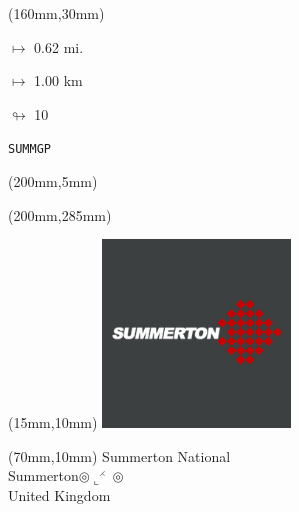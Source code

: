 \begin{textblock*}{40mm}(160mm,30mm)%
\Large
\par$\mapsto$ 0.62 mi.
\par$\mapsto$ 1.00 km
\par$\looparrowright$ 10
\par\hfill\tiny\tt SUMMGP\\
\end{textblock*}
\begin{textblock*}{20mm}(200mm,5mm)%
\fbox{\thepage}
\label{SUMMGP}
\end{textblock*}
\begin{textblock*}{20mm}(200mm,285mm)%
\fbox{\thepage}
\end{textblock*}

\null\newpage
\begin{textblock*}{50mm}(15mm,10mm)%
\includegraphics[width=50mm]{LG/SUMM.png}
\end{textblock*}
\begin{textblock*}{130mm}(70mm,10mm)%
{\fontsize{20}{20}\selectfont Summerton National\\}
{\fontsize{16}{16}\selectfont Summerton\hfill $\circledcirc\llcorner^{\rightthreetimes}\circledcirc$\\}
{\fontsize{12}{12}\selectfont United Kingdom\\}
\end{textblock*}

